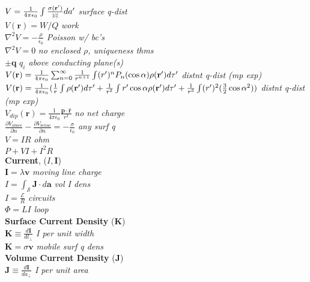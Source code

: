 \documentclass[9pt]{extarticle}
\def\rcurs{{\mbox{$\resizebox{.09in}{.08in}{\texttt{[image: ScriptR]}}$}}}
\begin{document}
\begin{multicols}{3}
$V = \frac{1}{4\pi\epsilon_{0}}\int\frac{\sigma(\mathbf{r'})}{\rcurs}da'$ \textit{surface q-dist} \\
$V(\mathbf{r}) = W/Q$ \textit{work} \\
$\nabla^{2}V = -\frac{\rho}{\epsilon_{0}}$ \textit{Poisson w/ bc's} \\
$\nabla^{2}V = 0$ \textit{no enclosed $\rho$, uniqueness thms} \\
$\pm\mathbf{q}$  \textit{$q_{i}$ above conducting plane(s)} \\
$V(\mathbf{r}) = \frac{1}{4\pi\epsilon_{0}}\sum_{n=0}^{\infty}\frac{1}{r^{n+1}}\\\int(r')^{n}P_{n}(\cos{\alpha})\rho(\mathbf{r'})d\tau'$ \textit{distnt q-dist (mp exp)} \\
$V(\mathbf{r}) = \frac{1}{4\pi\epsilon_{0}} (\frac{1}{r}\int\rho(\mathbf{r'})d\tau' \\ + \frac{1}{r^{2}}\int r'\cos{\alpha}\rho(\mathbf{r'})d\tau' \\ + \frac{1}{r^{3}}\int(r')^{2}(\frac{3}{2}\cos{\alpha}^{2}))$  \textit{distnt q-dist (mp exp)} \\
$V_{dip}(\mathbf{r}) = \frac{1}{4\pi\epsilon_{0}}\frac{\mathbf{p}\cdot\mathbf{\hat{r}}}{r^{2}}$  \textit{no net charge} \\
$\frac{\partial V_{above}}{\partial n} - \frac{\partial V_{below}}{\partial n} = -\frac{\sigma}{\epsilon_{0}}$ \textit{any surf q} \\
$V=IR$ \textit{ohm} \\
$P + VI + I^{2}R$  \\
\textbf{Current}, ($I, \mathbf{I}$) \\
$\mathbf{I} = \lambda\mathbf{v}$ \textit{moving line charge} \\
$I = \int_{\mathcal{S}} \mathbf{J}\cdot d\mathbf{a}$ \textit{vol I dens} \\
$I = \frac{\mathcal{E}}{R}$ \textit{circuits} \\
$\Phi = LI$ \textit{loop} \\
\textbf{Surface Current Density} ($\mathbf{K}$) \\
$\mathbf{K} \equiv \frac{d\mathbf{I}}{dl_{\perp}}$ \textit{I per unit width} \\
$\mathbf{K} = \sigma\mathbf{v}$ \textit{mobile surf q dens} \\
\textbf{Volume Current Density} ($\mathbf{J}$) \\
$\mathbf{J} \equiv \frac{d\mathbf{I}}{da_{\perp}}$ \textit{I per unit area} \\

\end{multicols}
\end{document}
